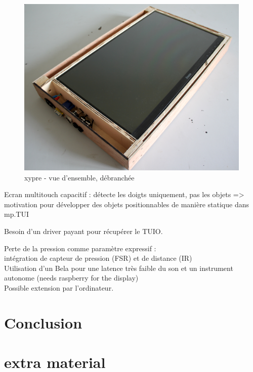 \begin{figure}[!htbp]
	\includegraphics[width=\textwidth]{gfx/04_interfaces/xypre_overview_unplugged.jpg}
	\caption{xypre - vue d'ensemble, débranchée}
	\label{fig:interface:xypre}
\end{figure}

Ecran multitouch capacitif : détecte les doigts uniquement, pas les objets => motivation pour développer des objets positionnables de manière statique dans mp.TUI

Besoin d'un driver payant pour récupérer le TUIO.

Perte de la pression comme paramètre expressif :\\
intégration de capteur de pression (FSR) et de distance (IR)\\
Utilisation d'un Bela pour une latence très faible du son et un instrument autonome (needs raspberry for the display)\\
Possible extension par l'ordinateur.


\section{Conclusion}
\label{sec:interfaces:conclusion}


\section*{extra material}




 \cite{bin_hands_2017}

